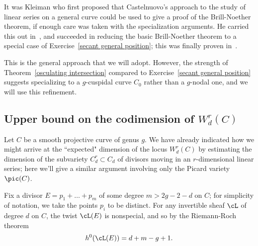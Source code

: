 
It was Kleiman who first proposed that Castelnuovo's approach to the study of linear series on a general curve could be used to give a proof of the Brill-Noether theorem, if enough care was taken with the specialization arguments. He carried this out in~\cite{Kleiman-special}, and succeeded in reducing the basic Brill-Noether theorem to a special case of Exercise~\ref{secant general position}; this was finally proven in~\cite{Griffiths-Harris-BN}.

This is the general approach that we will adopt. However, the strength of Theorem~\ref{osculating intersection} compared to Exercise~\ref{secant general position} suggests specializing to a $g$-cuspidal curve $C_0$ rather than a $g$-nodal one, and we will use
this refinement.


\subsection{Upper bound on the codimension of $W^r_d(C)$}

Let $C$ be a smooth projective curve of genus $g$. We have already indicated how we might arrive at the ``expected" dimension of the locus $W^r_d(C)$ by estimating the dimension of the subvariety $C^r_d \subset C_d$ of divisors moving in an $r$-dimensional linear series; here we'll give a similar argument involving only the Picard variety $\pic(C)$.

Fix a divisor $E = p_1 + \dots + p_m$ of some degree $m > 2g-2-d$ on $C$; for simplicity of notation, we take the points $p_i$ to be distinct. For any invertible sheaf $\cL$ of degree $d$ on $C$, the twist $\cL(E)$ is nonspecial, and so by the Riemann-Roch theorem 
$$
h^0(\cL(E)) = d + m - g + 1.
$$


